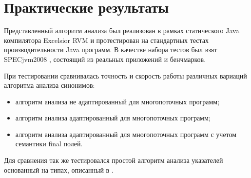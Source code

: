 \documentclass[14pt,titlepage]{extarticle}
\newcommand{\todo}[1]{\textcolor{red}{TODO: #1}}
\let\oldsection\section
\renewcommand{\section}{\newpage\oldsection}
\begin{document}



  \section{Практические результаты}

    Представленный алгоритм анализа был реализован в рамках статического
    Java компилятора Excelsior RVM и протестирован на стандартных тестах
    производительности Java программ.
    В качестве набора тестов был взят SPECjvm2008 \cite{spec_jvm}, состоящий из
    реальных приложений и бенчмарков.

    При тестировании сравнивалась точность и скорость работы различных вариаций
    алгоритма анализа синонимов:
    \begin{itemize}
      \item алгоритм анализа не адаптированный для многопоточных программ;
      \item алгоритм анализа адаптированный для многопоточных программ;
      \item алгоритм анализа адаптированный для многопоточных программ с
            учетом семантики final полей.
    \end{itemize}
    Для сравнения так же тестировался простой алгоритм анализа указателей
    основанный на типах, описанный в \cite{diwan_tbaa}.
\end{document}
